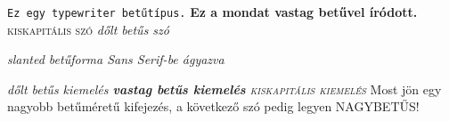 \documentclass[]{article}
\begin{document}
\texttt{Ez egy typewriter betűtípus.}
\newline
\textbf{Ez a mondat vastag betűvel íródott.}
\newline\newline
\textsc{kiskapitális szó}
\newline
\textit{dőlt betűs szó}
\newline\newline
\begin{sffamily}
\textsl{slanted betűforma Sans Serif-be ágyazva}
\end{sffamily}
\newline\newline
\emph{\textit{dőlt betűs kiemelés}
\newline
\textbf{vastag betűs kiemelés}
\newline
\textsc{kiskapitális kiemelés}}
\newline\newline
Most jön egy nagyobb betűméretű \Large{kifejezés}, a következő szó pedig legyen \MakeUppercase{nagybetűs}!
\end{document}

